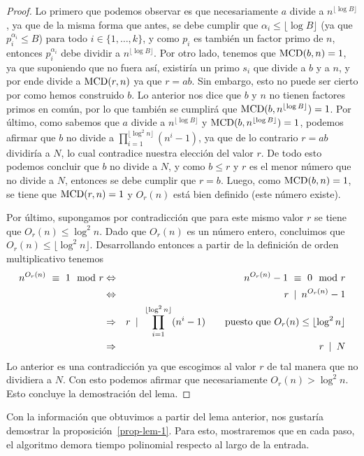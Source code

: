 \documentclass[10pt]{article}
\newcommand{\0}{\mathbf{0}}
\newcommand{\1}{\mathbf{1}}
\newcommand{\divi}{\hspace{1.8pt}|\hspace{1.8pt}}
\newcommand{\modl}{\mod}
\newcommand{\MCD}{{\rm MCD}}
\newcommand{\+}{\oplus}
\newcommand{\comentario}[1]{}
\theoremstyle{remark}
\theoremstyle{remark}
\begin{document}
\begin{proof}
Lo primero que podemos observar es que necesariamente $a$ divide a $n^{\lfloor \log B\rfloor}$, ya que de la misma forma que antes, se debe cumplir que $\alpha_i\leq \lfloor \log B\rfloor$ (ya que $p_i^{\alpha_i}\leq B$) para todo $i \in \{1, \ldots, k\}$, y como $p_i$ es también un factor primo de $n$, entonces $p_i^{\alpha_i}$ debe dividir a $n^{\lfloor \log B\rfloor}$. Por otro lado, tenemos que $\MCD(b,n) = 1$, ya que suponiendo que no fuera así, existiría un primo $s_i$ que divide a $b$ y a $n$, y por ende divide a $\MCD(r,n)$ ya que $r=ab$. Sin embargo, esto no puede ser cierto por como hemos construido $b$. Lo anterior nos dice que $b$ y $n$ no tienen factores primos en común, por lo que también se cumplirá que $\MCD(b,n^{\lfloor \log B\rfloor}) = 1$. Por último, como sabemos que $a$ divide a $n^{\lfloor \log B\rfloor}$ y $\MCD(b,n^{\lfloor \log B\rfloor})=1$, podemos afirmar que $b$ no divide a $\prod_{i=1}^{\lfloor \log ^2n \rfloor} (n^i-1)$, ya que de lo contrario $r = ab$ dividiría a $N$, lo cual contradice nuestra elección del valor $r$. De todo esto podemos concluir que $b$ no divide a $N$, y como $b\leq r$ y $r$ es el menor número que no divide a $N$, entonces se debe cumplir que $r = b$. Luego,  como $\MCD(b,n)=1$, se tiene que $\MCD(r,n) = 1$ y $O_r(n)$ está bien definido (este número existe).

Por último, supongamos por contradicción que para este mismo valor $r$ se tiene que $O_r(n) \leq \log^2 n$. Dado que $O_r(n)$ es un número entero, concluimos que $O_r(n) \leq \lfloor\log^2 n\rfloor$.
Desarrollando entonces a partir de la definición de orden multiplicativo tenemos
\begin{eqnarray*}
	n^{O_r(n)} \ \equiv \ 1 \modl r & \Leftrightarrow & n^{O_r(n)} - 1 \ \equiv \ 0 \modl r \\
	& \Leftrightarrow & r\ \divi \ n^{O_r(n)} - 1\\
	&\Rightarrow & r \ \divi \ \prod_{i=1}^{ \lfloor\log ^2n\rfloor} (n^i-1) \quad\quad \text{puesto que }O_r(n) \leq \lfloor \log^2 n \rfloor\\	
	&\Rightarrow & r\ \divi \ N 
\end{eqnarray*}
Lo anterior es una contradicción ya que escogimos al valor $r$ de tal manera que no dividiera a $N$. Con esto podemos afirmar que necesariamente $O_r(n) > \log^2 n$. Esto concluye la demostración del lema. 
	\end{proof}
	Con la información que obtuvimos a partir del lema anterior, nos gustaría demostrar la proposición~\ref{prop-lem-1}. Para esto, mostraremos que en cada paso, el algoritmo demora tiempo polinomial respecto al largo de la entrada.
\end{document}
